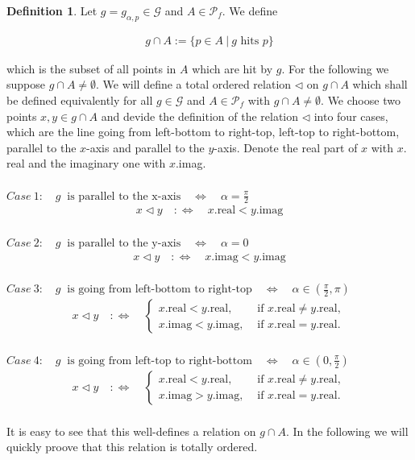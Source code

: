 \documentclass[12pt,a4paper]{scrartcl}
\numberwithin{equation}{subsection}
\newcommand{\1}{\mathbbm{1}}
\newcommand{\G}{\mathcal{G}}
\numberwithin{equation}{section}
\theoremstyle{definition}
\newtheorem{definition}{Definition}[subsection]
\begin{document}
\begin{definition}
	Let $g=g_{\alpha,p}\in \G$ and $A\in \mathcal{P}_f$. We define 
	
	\begin{align*}
		g\cap A := \{ p\in A\ |\ g \text{ hits } p\}
	\end{align*}
	
	which is the subset of all points in $A$ which are hit by $g$. For the following we suppose $g\cap A \neq \emptyset$. We will define a total ordered relation $\triangleleft$ on $g\cap A$ which shall be defined equivalently for all $g\in \G$ and $A\in\mathcal{P}_f$ with $g\cap A \neq\emptyset$. We choose two points $x,y\in g\cap A$ and devide the definition of the relation $\triangleleft$ into four cases, which are the line going from left-bottom to right-top, left-top to right-bottom, parallel to the $x$-axis and parallel to the $y$-axis. Denote the real part of $x$ with $x.$real and the imaginary one with $x.$imag. \\
	\\
	$\mathit{Case}\ 1:\quad g\ \text{ is parallel to the x-axis}\quad \Leftrightarrow\quad \alpha = \frac{\pi}{2}$
	\begin{align*}
	x \triangleleft y \quad :\Leftrightarrow \quad x.\text{real} < y.\text{imag}
	\end{align*}\\
	$\mathit{Case}\ 2:\quad g\ \text{ is parallel to the y-axis}\quad \Leftrightarrow\quad \alpha = 0$
	\begin{align*}
	x \triangleleft y \quad :\Leftrightarrow \quad x.\text{imag} < y.\text{imag}
	\end{align*}\\
	$\mathit{Case}\ 3:\quad g\ \text{ is going from left-bottom to right-top}\quad \Leftrightarrow\quad \alpha\in (\frac{\pi}{2},\pi)$
	\begin{align*}
	x \triangleleft y \quad :\Leftrightarrow \quad
		\begin{cases}
			x.\text{real} < y.\text{real}, & \text{ if } x.\text{real} \neq y.\text{real}, \\
			x.\text{imag} < y.\text{imag}, & \text{ if } x.\text{real} = y.\text{real}.
		\end{cases}
	\end{align*}\\
	$\mathit{Case}\ 4:\quad g\ \text{ is going from left-top to right-bottom}\quad \Leftrightarrow\quad \alpha\in (0,\frac{\pi}{2})$
	\begin{align*}
	x \triangleleft y \quad :\Leftrightarrow \quad
	\begin{cases}
	x.\text{real} < y.\text{real}, & \text{ if } x.\text{real} \neq y.\text{real}, \\
	x.\text{imag} > y.\text{imag}, & \text{ if } x.\text{real} = y.\text{real}.
	\end{cases}
	\end{align*}\\
	It is easy to see that this well-defines a relation on $g\cap A$. In the following we will quickly proove that this relation is totally ordered. 
\end{definition}
\end{document}
